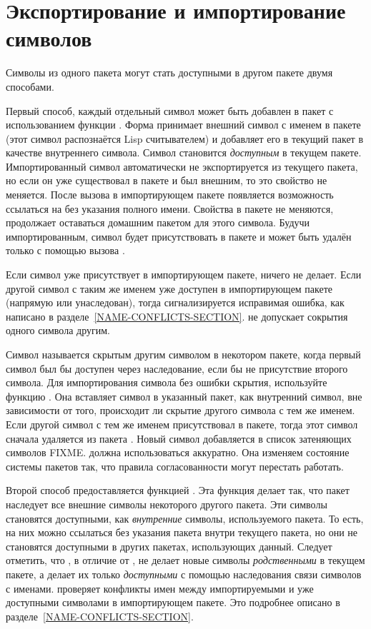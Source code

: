 \section{Экспортирование и импортирование символов} 
\label{EXPORT-IMPORT-SECTION}

Символы из одного пакета могут стать доступными в другом пакете двумя способами.

Первый способ, каждый отдельный символ может быть добавлен в пакет с
использованием функции . Форма 
принимает внешний 
символ с именем  в пакете  (этот символ распознаётся Lisp
считывателем) и добавляет его в текущий пакет в качестве внутреннего
символа. Символ становится \emph{доступным} в текущем пакете. Импортированный
символ автоматически не экспортируется из текущего пакета, но если он уже
существовал в 
пакете и был внешним, то это свойство не меняется. После вызова 
в импортирующем пакете появляется возможность ссылаться на  без
указания полного имени. Свойства  в пакете  не меняются,
 продолжает оставаться домашним пакетом для этого символа. Будучи
импортированным, символ будет присутствовать в пакете и может быть удалён только
с помощью вызова .

Если символ уже присутствует в импортирующем пакете,  ничего не
делает. Если другой символ с таким же именем  уже доступен в
импортирующем пакете (напрямую или унаследован), тогда сигнализируется
исправимая ошибка, как написано в
разделе~\ref{NAME-CONFLICTS-SECTION}.  не допускает сокрытия
одного символа другим.

Символ называется скрытым другим символом в некотором пакете, когда первый
символ был бы доступен через наследование, если бы не присутствие второго
символа.
Для импортирования символа без ошибки скрытия, используйте функцию
. Она вставляет символ в указанный пакет, как внутренний
символ, вне зависимости от того, происходит ли скрытие другого символа с тем же
именем.
Если другой символ с тем же именем присутствовал в пакете, тогда этот символ
сначала удаляется из пакета . Новый символ добавляется в список
затеняющих символов FIXME.  должна использоваться
аккуратно. Она изменяем состояние системы пакетов так, что правила согласованности
могут перестать работать.

Второй способ предоставляется функцией . Эта функция делает
так, что пакет наследует все внешние символы некоторого другого пакета. Эти
символы становятся доступными, как \emph{внутренние} символы, используемого
пакета. То есть, на них можно ссылаться без указания пакета внутри текущего
пакета, но они не становятся доступными в других пакетах, использующих
данный. Следует отметить, что , в отличие от , не
делает новые символы \emph{родственными} в текущем пакете, а делает их только
\emph{доступными} с помощью наследования связи символов с именами.
 проверяет конфликты имен между импортируемыми и уже доступными
символами в импортирующем пакете. Это подробнее описано в
разделе~\ref{NAME-CONFLICTS-SECTION}.

